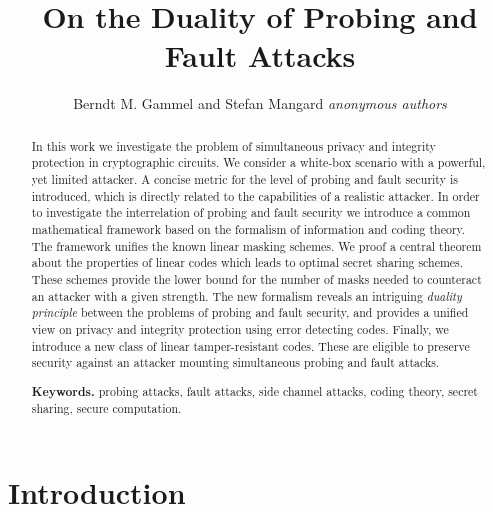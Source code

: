 \documentclass[11pt]{llncs}
\begin{document}
\title{On the Duality of Probing and Fault Attacks}
\author{\ifHIDE
  Berndt M. Gammel and Stefan Mangard
\else
  \emph{anonymous authors}\newline
\fi }
\ifHIDE
\else
 \institute{\quad\vspace*{8em}}
\fi
\maketitle


\begin{abstract}
In this work we investigate the problem of simultaneous privacy and
integrity protection in cryptographic circuits. We consider a
white-box scenario with a powerful, yet limited attacker. A concise
metric for the level of probing and fault security is introduced,
which is directly related to the capabilities of a realistic
attacker. In order to investigate the interrelation of probing and
fault security we introduce a common mathematical framework based on
the formalism of information and coding theory. The framework
unifies the known linear masking schemes. We proof a central theorem
about the properties of linear codes which leads to optimal secret
sharing schemes. These schemes provide the lower bound for the
number of masks needed to counteract an attacker with a given
strength. The new formalism reveals an intriguing \emph{duality
principle} between the problems of probing and fault security, and
provides a unified view on privacy and integrity protection using
error detecting codes. Finally, we introduce a new class of linear
tamper-resistant codes. These are eligible to preserve security
against an attacker mounting simultaneous probing and fault attacks.

\vspace*{1em}
\textbf{Keywords.}
  probing attacks, fault attacks, side channel attacks,
  coding theory, secret sharing, secure computation.
\end{abstract}


\section{Introduction}   \label{Sec:Introduction}
\end{document}
